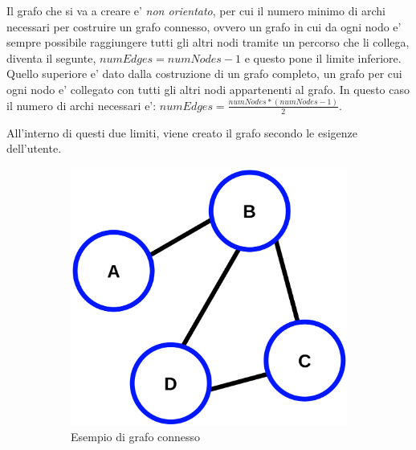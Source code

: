 Il grafo che si va a creare e' \emph{non orientato}, per cui il numero minimo di archi necessari 
per costruire un grafo connesso, ovvero un grafo in cui da ogni nodo e' sempre possibile raggiungere
tutti gli altri nodi tramite un percorso che li collega, diventa il segunte, $numEdges = numNodes-1$
e questo pone il limite inferiore. Quello superiore e' dato dalla costruzione di un grafo completo, 
un grafo per cui ogni nodo e' collegato con tutti gli altri nodi appartenenti al grafo. In questo 
caso il numero di archi necessari e': $numEdges = \frac{numNodes*(numNodes-1)}{2}$.

All'interno di questi due limiti, viene creato il grafo secondo le esigenze dell'utente.

\begin{figure}[!hb]
	\centering
	\begin{subfigure}[b]{0.45\textwidth}
		\centering
		\includegraphics[width=\textwidth]{img/CPT-Graphs-undirected-unweighted-ex1.svg.png}
		\caption{Esempio di grafo connesso}
		\label{fig:connected_graph_example}
	\end{subfigure}
	\hfill
	\begin{subfigure}[b]{0.45\textwidth}
		\centering

\end{subfigure}
\end{figure}
